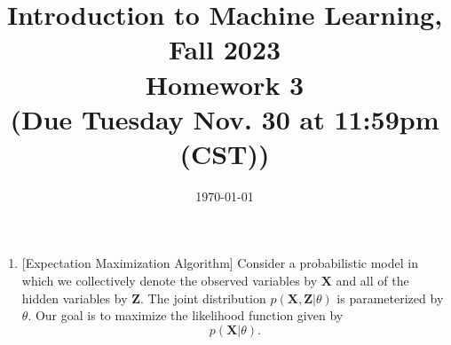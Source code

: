 \documentclass[10pt]{article}
\begin{document}
\date{\today}
\title{Introduction to Machine Learning, Fall 2023 \\
	Homework 3\\
	\small (Due Tuesday Nov. 30 at 11:59pm (CST))}
\maketitle

\begin{enumerate}[1.]

	\item {} [Expectation Maximization Algorithm]
            Consider a probabilistic model in which we collectively denote the observed variables by $\boldsymbol{X}$ and all of the hidden variables by $\boldsymbol{Z}$. The joint distribution $p(\boldsymbol{X},\boldsymbol{Z}|\theta)$ is parameterized by $\theta$. Our goal is to maximize the likelihood function given by
            \begin{equation}
                p(\boldsymbol{X}|\theta).
            \end{equation}
 

\end{enumerate}
\end{document}
